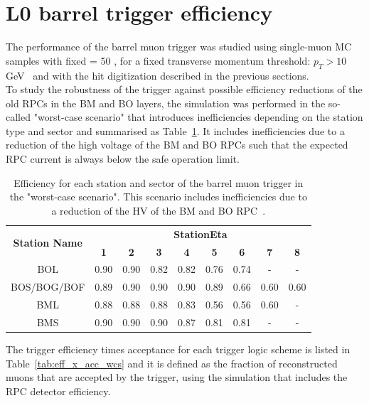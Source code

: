 \section{L0 barrel trigger efficiency}
\label{sec:eff}
The performance of the barrel muon trigger was studied using single-muon MC samples with fixed \pT = 50 \GeV, for a fixed transverse momentum threshold: $p_{T} > 10$ GeV~\cite{Marcoccia:2693982} and with the hit digitization described in the previous sections.\\
To study the robustness of the trigger against possible efficiency reductions of the old RPCs in the BM and BO layers, the simulation was performed in the so-called "worst-case scenario" that introduces inefficiencies depending on the station type and sector and summarised as Table~\ref{tab:WCS}. It includes inefficiencies due to a reduction of the high voltage of the BM and BO RPCs such that the expected RPC current is always below the safe operation limit.
\begin{table}[htbp]
	\begin{center}
		\begin{tabular}{c|cccccccc}
			\multirow{2}{*}{\textbf{Station Name}} & \multicolumn{8}{c}{\textbf{StationEta}}\\
			\cline{2-9}
			& \textbf{1} & \textbf{2} & \textbf{3} & \textbf{4} & \textbf{5} & \textbf{6} & \textbf{7} & \textbf{8}\\
			\hline 
			BOL                 				   & 0.90  	    & 0.90		 & 0.82 	  & 0.82 	   & 0.76 		& 0.74 		 & -	      & -    \\
			BOS/BOG/BOF 						   & 0.89 		& 0.90 		 & 0.90 	  & 0.90	   & 0.89 		& 0.66 		 & 0.60       & 0.60 \\
			BML                					   & 0.88		& 0.88 		 & 0.88 	  & 0.83 	   & 0.56 		& 0.56		 & 0.60       & -    \\
			BMS              					   & 0.90  	    & 0.90		 & 0.90 	  & 0.87 	   & 0.81 	    & 0.81    	 & -          & -    \\
			\hline 
		\end{tabular} 
		\caption{Efficiency for each station and sector of the barrel muon trigger in the "worst-case scenario". This scenario includes inefficiencies due to a reduction of the HV of the BM and BO RPC~\cite{Marcoccia:2693982}.} 
		\label{tab:WCS}
	\end{center} 
\end{table} 
\noindent The trigger efficiency times acceptance for each trigger logic scheme is listed in Table~\ref{tab:eff_x_acc_wcs} and it is defined as the fraction of reconstructed muons that are accepted by the trigger, using the simulation that includes the RPC detector efficiency.
